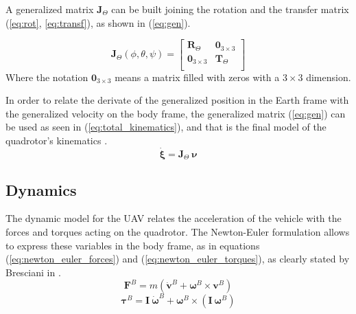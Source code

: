 \documentclass[journal]{IEEEtran}
\begin{document}
	A generalized matrix $\bm{J}_\Theta$ can be built joining the rotation and the transfer matrix (\ref{eq:rot}, \ref{eq:transf}), as shown in (\ref{eq:gen}).
	
	\begin{equation} \label{eq:gen}
	\bm{J}_\Theta (\phi,\theta, \psi)= \left[ {\begin{array}{cc}
		\bm{R}_\Theta &  \mathbf{0}_{3\times 3} \\
		\mathbf{0}_{3\times 3} & \bm{T}_\Theta \\
		\end{array} } \right]
	\end{equation}  
	Where the notation $\mathbf{0}_{3\times 3}$ means a matrix filled with zeros with a $3 \times 3$ dimension.
	
	In order to relate the derivate of the generalized position in the Earth frame with the generalized velocity on the body frame, the generalized matrix (\ref{eq:gen}) can be used as seen in (\ref{eq:total_kinematics}), and that is the final model of the quadrotor's kinematics \cite{SabatinoFrancesco2015Qcmn, mod_control_bresciani}.
	\begin{equation} \label{eq:total_kinematics}
	\bm{\dot\xi} = \bm{J}_\Theta \ 	\bm{\nu} 
	\end{equation} 
	
	\subsection{Dynamics}
	The dynamic model for the UAV relates the acceleration of the vehicle with the forces and torques acting on the quadrotor. The Newton-Euler formulation allows to express these variables in the body frame, as in equations (\ref{eq:newton_euler_forces}) and (\ref{eq:newton_euler_torques}), as clearly stated by Bresciani in \cite{mod_control_bresciani}.
	\begin{equation} \label{eq:newton_euler_forces}
	\bm{F}^B = m ( \bm{\dot v}^B + \bm{\omega}^B \times \bm{v}^B)
	\end{equation}
	\begin{equation} \label{eq:newton_euler_torques}
	\bm{\tau}^B = \bm{I} \ \bm{\dot \omega}^B + \bm{\omega}^B \times (\bm{I} \ \bm{\omega}^B)
	\end{equation}
	
\end{document}
